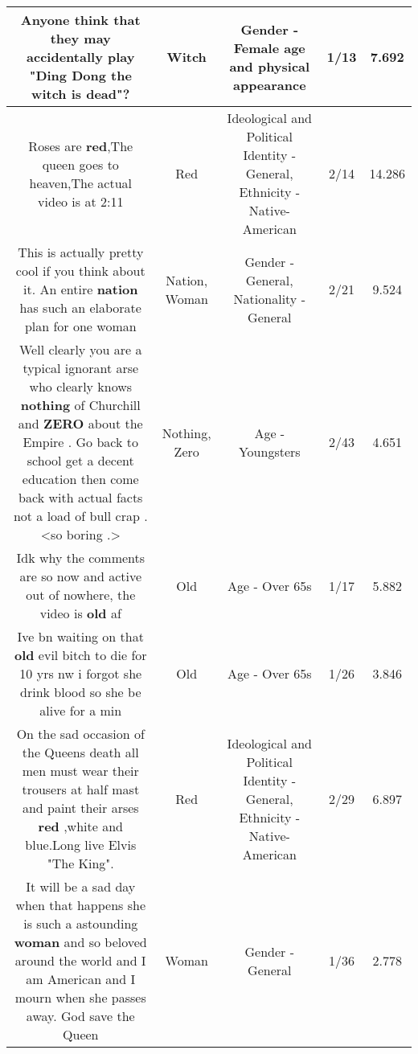 \documentclass[11pt]{article}
\newlength\mylength
\begin{document}
\begin{center}
\begin{longtable}{|C{.65\mylength}|C{.30\mylength}|C{.12\mylength}|C{.12\mylength}|C{.12\mylength}|}
  \small Anyone think that they may accidentally play "Ding Dong the \textbf{witch} is dead"?\normalsize   & Witch & Gender - Female age and physical appearance & 1/13 & 7.692 \\  \hline
  \small Roses are \textbf{r\textbf{ed}},The queen goes to heaven,The actual video is at 2:11\normalsize   & Red &  Ideological and Political Identity - General, Ethnicity - Native-American & 2/14 & 14.286 \\  \hline
  \small This is actually pretty cool if you think about it. An entire \textbf{nation} has such an elaborate plan for one woman\normalsize   & Nation, Woman & Gender - General, Nationality - General & 2/21 & 9.524 \\  \hline
  \small Well clearly you are a typical  ignorant arse who clearly knows \textbf{nothing} of Churchill  and \textbf{ZERO} about the Empire . Go back to school get a decent education then come back with actual facts not a load of bull crap .<so boring .>\normalsize   & Nothing, Zero & Age - Youngsters & 2/43 & 4.651 \\  \hline
  \small Idk why the comments are so now and active out of nowhere, the video is \textbf{old} af\normalsize   & Old & Age - Over 65s & 1/17 & 5.882 \\  \hline
  \small Ive bn waiting on that \textbf{old} evil bitch to die for 10 yrs nw i forgot she drink blood so she be alive for a min\normalsize   & Old & Age - Over 65s & 1/26 & 3.846 \\  \hline
  \small On the sad occasion of the Queens death all men must wear their trousers at half mast and paint their arses \textbf{r\textbf{ed}} ,white and blue.Long live Elvis "The King".\normalsize   & Red &  Ideological and Political Identity - General, Ethnicity - Native-American & 2/29 & 6.897 \\  \hline
  \small It will be a sad day when that happens she is such a astounding \textbf{woman} and so beloved around the world and I am American and I mourn when she passes away. God save the Queen\normalsize   & Woman & Gender - General & 1/36 & 2.778 \\  \hline

\end{longtable}
\end{center}
\end{document}
